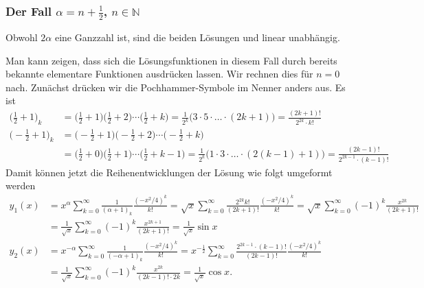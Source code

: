 %
%
\subsubsection{Der Fall $\alpha=n+\frac12$, $n\in\mathbb{N}$}
Obwohl $2\alpha$ eine Ganzzahl ist, sind die beiden Lösungen
\label{buch:differentialgleichunge:bessel:erste}
und
\label{buch:differentialgleichunge:bessel:zweite}
linear unabhängig.

Man kann zeigen, dass sich die Lösungsfunktionen in diesem Fall
durch bereits bekannte elementare Funktionen ausdrücken lassen.
Wir rechnen dies für $n=0$ nach.
Zunächst drücken wir die Pochhammer-Symbole im Nenner anders aus.
Es ist
\begin{align*}
\biggl(\frac12 + 1\biggr)_k
&=
\biggl(\frac12 + 1\biggr)
\biggl(\frac12 + 2\biggr)
\cdots
\biggl(\frac12 + k\biggr)
=
\frac{1}{2^k}\bigl(3\cdot 5\cdot\ldots\cdot (2k+1)\bigr)
=
\frac{(2k+1)!}{2^{2k}\cdot k!}
\\
\biggl(-\frac12 + 1\biggr)_k
&=
\biggl(-\frac12 + 1\biggr)
\biggl(-\frac12 + 2\biggr)
\cdots
\biggl(-\frac12 + k\biggr)
\\
&=
\biggl(\frac12 + 0\biggr)
\biggl(\frac12 + 1\biggr)
\cdots
\biggl(\frac12 + k-1\biggr)
=
\frac{1}{2^k}\bigl(1\cdot 3 \cdot\ldots\cdot (2(k-1)+1)\bigr)
=
\frac{(2k-1)!}{2^{2k-1}\cdot (k-1)!}
\end{align*}
Damit können jetzt die Reihenentwicklungen der Lösung wie folgt
umgeformt werden
\begin{align*}
y_1(x)
&=
x^\alpha
\sum_{k=0}^\infty
\frac{1}{(\alpha+1)_k}
\frac{(-x^2/4)^k}{k!}
=
\sqrt{x}
\sum_{k=0}^\infty
\frac{2^{2k}k!}{(2k+1)!}
\frac{(-x^2/4)^k}{k!}
=
\sqrt{x}
\sum_{k=0}^\infty
(-1)^k
\frac{x^{2k}}{(2k+1)!}
\\
&=
\frac{1}{\sqrt{x}}
\sum_{k=0}^\infty
(-1)^k
\frac{x^{2k+1}}{(2k+1)!}
=
\frac{1}{\sqrt{x}} \sin x
\\
y_2(x)
&=
x^{-\alpha}
\sum_{k=0}^\infty
\frac{1}{(-\alpha+1)_k}
\frac{(-x^2/4)^k}{k!}
=
x^{-\frac12}
\sum_{k=0}^\infty
\frac{2^{2k-1}\cdot (k-1)!}{(2k-1)!}
\frac{(-x^2/4)^k}{k!}
\\
&=
\frac{1}{\sqrt{x}}
\sum_{k=0}^\infty
(-1)^k
\frac{x^{2k}}{(2k-1)!\cdot 2k}
=
\frac{1}{\sqrt{x}} \cos x.
\end{align*}

